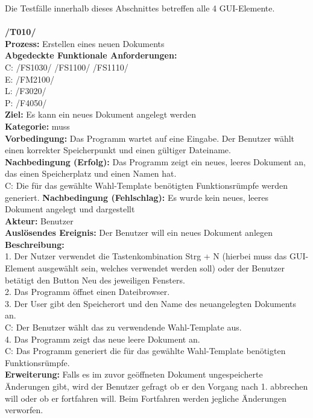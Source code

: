 \documentclass[a4paper]{scrreprt}
\begin{document}
Die Testfälle innerhalb dieses Abschnittes betreffen alle 4 GUI-Elemente. \\\\
\textbf{/T010/}\\
\textbf{Prozess: }Erstellen eines neuen Dokuments  \\
\textbf{Abgedeckte Funktionale Anforderungen:} \\
C: /FS1030/ /FS1100/ /FS1110/ \\
E: /FM2100/	\\
L: /F3020/ \\
P: /F4050/	\\
\textbf{Ziel:} Es kann ein neues Dokument angelegt werden\\
\textbf{Kategorie:} muss\\
\textbf{Vorbedingung:} Das Programm wartet auf eine Eingabe. Der Benutzer wählt einen korrekter Speicherpunkt und einen gültiger Dateiname.\\
\textbf{Nachbedingung (Erfolg):} Das Programm zeigt ein neues, leeres Dokument an, das einen Speicherplatz und einen Namen hat.\\
C: Die für das gewählte Wahl-Template benötigten Funktionsrümpfe werden generiert.
\textbf{Nachbedingung (Fehlschlag):} Es wurde kein neues, leeres Dokument angelegt und dargestellt\\
\textbf{Akteur:} Benutzer\\
\textbf{Auslösendes Ereignis:} Der Benutzer will ein neues Dokument anlegen\\
\textbf{Beschreibung:} \\
1. Der Nutzer verwendet die Tastenkombination Strg + N (hierbei muss das GUI-Element ausgewählt sein, welches verwendet werden soll) oder der Benutzer betätigt den Button Neu des jeweiligen Fensters. \\
2. Das Programm öffnet einen Dateibrowser.\\
3. Der User gibt den Speicherort und den Name des neuangelegten Dokuments an. \\
C: Der Benutzer wählt das zu verwendende Wahl-Template aus.\\
4. Das Programm zeigt das neue leere Dokument an. \\
C: Das Programm generiert die für das gewählte Wahl-Template benötigten Funktionsrümpfe. \\
\textbf {Erweiterung:} Falls es im zuvor geöffneten Dokument ungespeicherte Änderungen gibt, wird der Benutzer gefragt ob er den Vorgang nach 1. abbrechen will oder ob er fortfahren will. Beim Fortfahren werden jegliche Änderungen verworfen. \\
\end{document}
